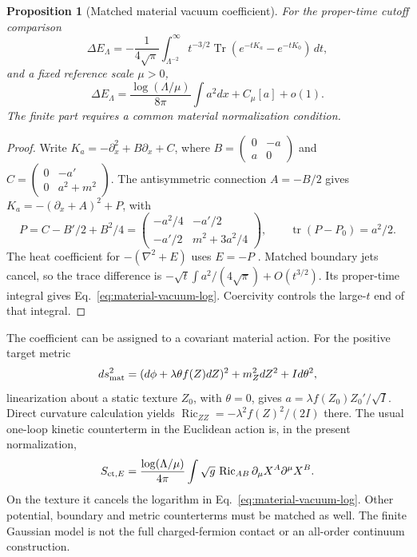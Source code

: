 \documentclass[12pt,a4paper]{article}
\newtheorem{proposition}[theorem]{Proposition}
\begin{document}
\begin{proposition}[Matched material vacuum coefficient]
\label{prop:material-vacuum-coefficient}
For the proper-time cutoff comparison
\[
 \Delta E_\Lambda=-\frac1{4\sqrt\pi}
 \int_{\Lambda^{-2}}^\infty t^{-3/2}
 \operatorname{Tr}(e^{-tK_a}-e^{-tK_0})\,dt,
\]
and a fixed reference scale $\mu>0$,
\begin{equation}\label{eq:material-vacuum-log}
 \Delta E_\Lambda=\frac{\log(\Lambda/\mu)}{8\pi}
                         \int a^2dx+C_\mu[a]+o(1).
\end{equation}
The finite part requires a common material normalization condition.
\end{proposition}
\begin{proof}
Write $K_a=-\partial_x^2+B\partial_x+C$, where
$B=\left(\begin{smallmatrix}0&-a\\a&0\end{smallmatrix}\right)$ and
$C=\left(\begin{smallmatrix}0&-a'\\0&a^2+m^2\end{smallmatrix}\right)$.
The antisymmetric connection $A=-B/2$ gives
$K_a=-(\partial_x+A)^2+P$, with
\[
 P=C-B'/2+B^2/4=
 \begin{pmatrix}-a^2/4&-a'/2\\-a'/2&m^2+3a^2/4\end{pmatrix},
 \qquad \operatorname{tr}(P-P_0)=a^2/2.
\]
The heat coefficient for $-(\nabla^2+E)$ uses $E=-P$
\cite[Eq.~(4.27)]{Vassilevich2003}. Matched boundary jets cancel,
so the trace difference is
$-\sqrt t\int a^2/(4\sqrt\pi)+O(t^{3/2})$.
Its proper-time integral gives Eq.~\eqref{eq:material-vacuum-log}.
Coercivity controls the large-$t$ end of that integral.
\end{proof}

The coefficient can be assigned to a covariant material action. For
the positive target metric
\[
 ds_{\rm mat}^2=(d\phi+\lambda\theta f(Z)dZ)^2
                  +m_Z^2dZ^2+I d\theta^2,
\]
linearization about a static texture $Z_0$, with $\theta=0$, gives
$a=\lambda f(Z_0)Z_0'/\sqrt I$. Direct curvature calculation yields
$\operatorname{Ric}_{ZZ}=-\lambda^2f(Z)^2/(2I)$ there.
The usual one-loop kinetic counterterm in the Euclidean action
\cite[Section~7.2]{Friedan1985} is, in the present normalization,
\[
 S_{{\rm ct},E}=\frac{\log(\Lambda/\mu)}{4\pi}
 \int\sqrt g\,\operatorname{Ric}_{AB}
                         \partial_\mu X^A\partial^\mu X^B.
\]
On the texture it cancels the logarithm in
Eq.~\eqref{eq:material-vacuum-log}. Other potential, boundary and
metric counterterms must be matched as well. The finite Gaussian model
is not the full charged-fermion contact or an all-order continuum construction.
\end{document}
